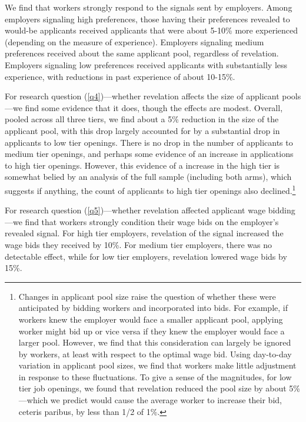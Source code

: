 We find that workers strongly respond to the signals sent by employers.
Among employers signaling high preferences, those having their preferences revealed to would-be applicants received applicants that were about 5-10\% more experienced (depending on the measure of experience). 
Employers signaling medium preferences received about the same applicant pool, regardless of revelation.
Employers signaling low preferences received applicants with substantially less experience, with reductions in past experience of about 10-15\%.

For research question (\ref{q4})---whether revelation affects the size of applicant pools---we find some evidence that it does, though the effects are modest.
Overall, pooled across all three tiers, we find about a 5\% reduction in the size of the applicant pool, with this drop largely accounted for by a substantial drop in applicants to low tier openings.
There is no drop in the number of applicants to medium tier openings, and perhaps some evidence of an increase in applications to high tier openings.
However, this evidence of a increase in the high tier is somewhat belied by an analysis of the full sample (including both arms), which suggests if anything, the count of applicants to high tier openings also declined.\footnote{ 
  Changes in applicant pool size raise the question of whether these were anticipated by bidding workers and incorporated into bids.
  For example, if workers knew the employer would face a smaller applicant pool, applying worker might bid up or vice versa if they knew the employer would face a larger pool.
  However, we find that this consideration can largely be ignored by workers, at least with respect to the optimal wage bid.
  Using day-to-day variation in applicant pool sizes, we find that workers make little adjustment in response to these fluctuations.
  To give a sense of the magnitudes, for low tier job openings, we found that revelation reduced the pool size by about 5\%---which we predict would cause the average worker to increase their bid, ceteris paribus, by less than 1/2 of 1\%. 
}

For research question (\ref{q5})---whether revelation affected applicant wage bidding---we find that workers strongly condition their wage bids on the employer's revealed signal.
For high tier employers, revelation of the signal increased the wage bids they received by 10\%.
For medium tier employers, there was no detectable effect, while for low tier employers, revelation lowered wage bids by 15\%.


